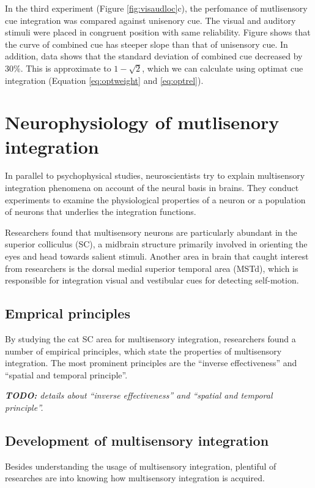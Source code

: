 \documentclass[12pt,twoside]{article}
\theoremstyle{plain}
\theoremstyle{definition}
\theoremstyle{remark}
\newcommand{\TODO}[1]{\emph{\small{{\bf TODO: } #1}}}
\begin{document}
In the third experiment (Figure \ref{fig:visaudloc}c), the perfomance of mutlisensory cue integration was compared against unisenory cue. The visual and auditory stimuli were placed in congruent position with same reliability. Figure shows that the curve of combined cue has steeper slope than that of unisensory cue. In addition, data shows that the standard deviation of combined cue decreased by $30\%$. This is approximate to $1-\sqrt{2}$, which we can calculate using optimat cue integration (Equation \ref{eq:optweight} and \ref{eq:optrel}).

\section{Neurophysiology of mutlisenory integration}
In parallel to psychophysical studies, neuroscientists try to explain multisensory integration phenomena on account of the neural basis in brains.
They conduct experiments to examine the physiological properties of a neuron or a population of neurons that underlies the integration functions.

Researchers found that multisensory neurons are particularly abundant in the superior colliculus (SC), a midbrain structure primarily involved in orienting the eyes and head towards salient stimuli\cite{sparks_translation_1986}. Another area in brain that caught interest from researchers is the dorsal medial superior temporal area (MSTd), which is responsible for integration visual and vestibular cues for detecting self-motion\cite{gu_visual_2006}.

\subsection{Emprical principles}
By studying the cat SC area for multisensory integration, researchers found a number of empirical principles, which state the properties of multisensory integration\cite{meredith_interactions_1983}. The most prominent principles are the ``inverse effectiveness'' and ``spatial and temporal principle''.

\TODO{details about ``inverse effectiveness'' and ``spatial and temporal principle''.}

\subsection{Development of multisensory integration}
Besides understanding the usage of multisensory integration, plentiful of researches are into knowing how multisensory integration is acquired. 
\end{document}
